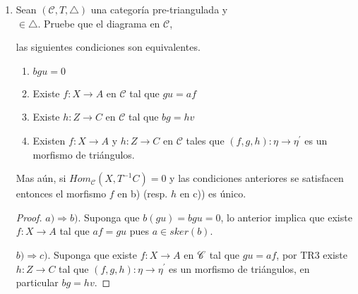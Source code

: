 \documentclass{article}
\begin{document}
\begin{enumerate}[label=\textbf{Ej \arabic*.}]
\begin{proof}
			Ahora, por el lema de Yoneda existe $g:B\to A$ tal que \\$\operatorname{Hom}^{-1}_{\mathscr{C}}(A,h)= 
			\operatorname{Hom}_{\mathscr{C}}(A,g)$ en particular \\
			$h\circ g=\operatorname{Hom}^{-1}_{\mathscr{C}}(A,h)(g)=
			\operatorname{Hom}_{\mathscr{C}}(A,h)\operatorname{Hom}^{-1}_{\mathscr{C}}(A,h)(1_B) =1_B$ y \\
			$g\circ h=\operatorname{Hom}^{-1}_{\mathscr{C}}(A,h)\operatorname{Hom}_{\mathscr{C}}(A,h)(1_A)=1_A$ 
			por lo que $h$ es isomorfismo.
			
		\end{proof}
		\item Sean $(\mathscr{C},T,\triangle)$ una categoría pre-triangulada y  \\  $\in \triangle$. Pruebe que el diagrama en $\mathscr{C}$,
		
		\begin{center}
		\end{center}
		las siguientes condiciones son equivalentes.
		
		\begin{enumerate}
			\item $bgu=0$
			\item Existe $f:X\to A$ en $\mathscr{C}$ tal que $gu=af$
			\item Existe $h:Z\to C$ en $\mathscr{C}$ tal que $bg=hv$
			\item Existen $f:X\to A$ y $h:Z\to C$ en $\mathscr{C}$ tales que $(f,g,h):\eta \to \eta^{'}$ es un morfismo de triángulos. 
		\end{enumerate}
		Mas a\'un, si $Hom_{\mathscr{C}}(X,T^{-1}C)=0$ y las condiciones anteriores se satisfacen entonces el morfismo $f$ en b) (resp. $h$ en c)) es \'unico.
		
		\begin{proof}
			$a) \Rightarrow b)$. Suponga que $b(gu)=bgu=0$, lo anterior implica que existe $f:X\to A$ tal que $af=gu$ pues $a\in sker(b)$.
			
			\bigskip
			
			$b) \Rightarrow c)$. Suponga que existe $f:X\to A$ en $\mathscr{C}$ tal que $gu=af$, por TR3 existe $h:Z\to C$ tal que $(f,g,h):\eta \to \eta^{'}$ es un morfismo de triángulos, en particular $bg=hv$.
			

\end{proof}
\end{enumerate}
\end{document}
